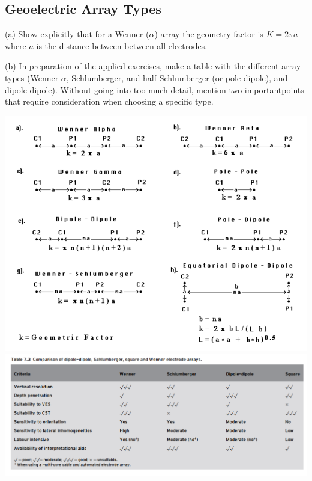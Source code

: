 \subsection{Geoelectric Array Types}
(a) Show explicitly that for a Wenner ($\alpha$) array the geometry factor is $K = 2\pi a$ where $a$ is the distance between between all electrodes.

(b) In preparation of the applied exercises, make a table with the different array types (Wenner $\alpha$, Schlumberger, and half-Schlumberger (or pole-dipole), and dipole-dipole). Without going into too much detail, mention two importantpoints that require consideration when choosing a specific type.
\ifanswers
    \begin{tcolorbox}[enhanced jigsaw,breakable,pad at break*=1mm,
    colback=blue!5!white,colframe=babyblueeyes,title=Solutions,
    watermark color=white]
    \includegraphics*[width=0.8\linewidth]{Figures/Resistivity/ArrrayTypes_Loke.png}
    \includegraphics*[width=0.8\linewidth]{Figures/Resistivity/ArrrayProperties_Reynolds.png}
    \end{tcolorbox}
\fi
